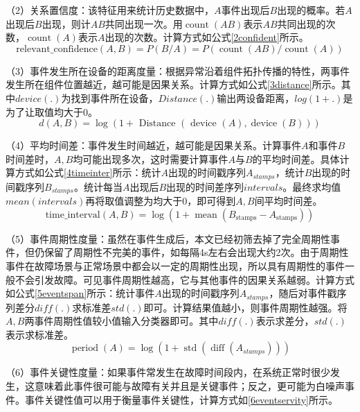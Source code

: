 （2）关系置信度：该特征用来统计历史数据中，$A$事件出现后$B$出现的概率。若$A$出现后$B$出现，则计$AB$共同出现一次。用$\operatorname{count}(A B)$表示$AB$共同出现的次数，$\operatorname{count}(A)$表示$A$出现的次数。计算方式如公式\ref{2confident}所示。
\begin{equation}
    \operatorname{{ relevant }\_{confidence }}(A, B)=P(B/A)=P(\operatorname{count}(A B) / \operatorname{count}(A))\label{2confident}
\end{equation}

（3）事件发生所在设备的距离度量：根据异常沿着组件拓扑传播的特性，两事件发生所在组件位置越近，越可能是因果关系。计算方式如公式\ref{3distance}所示。其中$device(.)$为找到事件所在设备，$Distance(.)$输出两设备距离，$log(1+.)$是为了让取值均大于0。
\begin{equation}
    d(A, B)=\log (1+\text { Distance }(\text { device }(A), \operatorname{device}(B)))\label{3distance}
\end{equation}

（4）平均时间差：事件发生时间越近，越可能是因果关系。计算事件$A$和事件$B$时间差时，$A,B$均可能出现多次，这时需要计算事件$A$与$B$的平均时间差。具体计算方式如公式\ref{4timeinter}所示：统计$A$出现的时间戳序列$A_{stamps}$，统计$B$出现的时间戳序列$B_{stamps}$。统计每当$A$出现后$B$出现的时间差序列$intervals$。最终求均值$mean(intervals)$再将取值调整为均大于0，即可得到$A,B$间平均时间差。
\begin{equation}
    \operatorname{\text{time}\_{interval}}\left ( A,B \right ) =  \log\left ({1+  \operatorname{mean} \left ( B_\text{stamps} - A_\text{stamps} \right ) } \right )\label{4timeinter}
\end{equation}

（5）事件周期性度量：虽然在事件生成后，本文已经初筛去掉了完全周期性事件，但仍保留了周期性不完美的事件，如每隔4s左右会出现大约2次。由于周期性事件在故障场景与正常场景中都会以一定的周期性出现，所以具有周期性的事件一般不会引发故障。可见事件周期性越高，它与其他事件的因果关系越弱。计算方式如公式\ref{5eventspan}所示：统计事件$A$出现的时间戳序列$A_{stamps}$，随后对事件戳序列差分$diff(.)$求标准差$std(.)$即可。计算结果值越小，则事件周期性越强。将$A,B$两事件周期性值较小值输入分类器即可。其中$diff(.)$表示求差分，$std(.)$表示求标准差。
\begin{equation}
    \operatorname{period}(A)=\log \left(1+\operatorname{std}\left(\operatorname{diff}\left(A_{stamps}\right)\right)\right)\label{5eventspan}
\end{equation}

（6）事件关键性度量：如果事件常发生在故障时间段内，在系统正常时很少发生，这意味着此事件很可能与故障有关并且是关键事件；反之，更可能为白噪声事件。事件关键性值可以用于衡量事件关键性，计算方式如\ref{6eventservity}所示。

